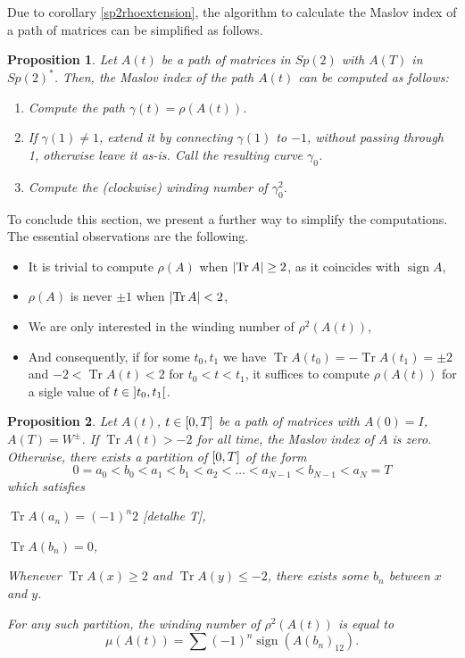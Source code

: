 \documentclass{article}
\newtheorem{prop}{Proposition}
\theoremstyle{nonumberplain}
\DeclareMathOperator{\sign}{sign}
\DeclarePairedDelimiter{\abs}{\lvert}{\rvert}
\DeclareMathOperator{\trace}{Tr}
\begin{document}
Due to corollary \ref{sp2rhoextension}, the algorithm to calculate the Maslov index of a path of matrices can be simplified as follows.

\begin{prop}
Let $A(t)$ be a path of matrices in $Sp(2)$ with $A(T)$ in $Sp(2)^*$. Then, the Maslov index of the path $A(t)$ can be computed as follows:

\begin{enumerate}[algorithm]
\item Compute the path $\gamma(t) = \rho(A(t))$. 
\item If $\gamma(1) \neq 1$, extend it by connecting $\gamma(1)$ to $-1$, without passing through 1, otherwise leave it as-is. Call the resulting curve $\gamma_0$.
\item Compute the (clockwise) winding number of $\gamma_0^2$.
\end{enumerate}
\end{prop}

To conclude this section, we present a further way to simplify the computations. The essential observations are the following.
\begin{itemize}
\item It is trivial to compute $\rho(A)$ when $\abs{\trace A} \geq 2$, as it coincides with $\sign A$,
\item $\rho(A)$ is never $\pm 1$ when $\abs{\trace A} < 2$,
\item We are only interested in the winding number of $\rho^2(A(t))$,
\item And consequently, if for some $t_0, t_1$ we have $\trace A(t_0) = - \trace A(t_1) = \pm 2$ and $-2 < \trace A(t) < 2$ for $t_0 < t < t_1$, it suffices to compute $\rho(A(t))$ for a sigle value of $t \in \ointerval{t_0}{t_1}$.
\end{itemize}

\begin{prop}\label{calcmaslov}
Let $A(t)$, $t \in \interval 0 T$ be a path of matrices with $A(0) = I$, $A(T) = W^\pm$. If $\trace A(t) > -2$ for all time, the Maslov index of $A$ is zero. Otherwise, there exists a partition of $\interval 0 T$ of the form
\begin{equation}\label{calcmaslov:ab1}
0 = a_0 < b_0 < a_1 < b_1 < a_2 < \dots < a_{N-1} < b_{N-1} < a_N = T
\end{equation}
which satisfies \begin{enumerate*}\item\label{calcmaslov:ab2} $\trace A(a_n) = (-1)^n 2$ [detalhe T], \item\label{calcmaslov:ab3} $\trace A(b_n) = 0$, \item\label{calcmaslov:ab4} Whenever $\trace A(x) \geq 2$ and $\trace A(y) \leq -2$, there exists some $b_n$ between $x$ and $y$.\end{enumerate*}

For any such partition, the winding number of $\rho^2(A(t))$ is equal to
\begin{equation}\label{calcmaslov:mu}
\mu(A(t)) = \sum (-1)^n \sign(A(b_n)_{12}).
\end{equation}
\end{prop}
\end{document}
